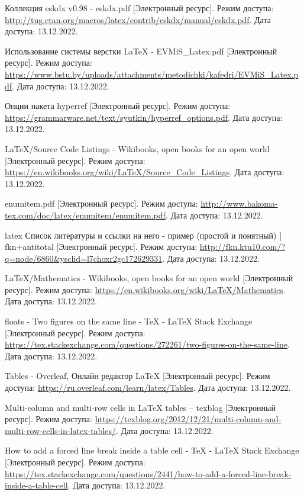   \begin{thebibliography}{}
    Коллекция eskdx v0.98 - eskdx.pdf
    [Электронный ресурс].
    Режим доступа: \url{http://tug.ctan.org/macros/latex/contrib/eskdx/manual/eskdx.pdf}.
    Дата доступа: 13.12.2022.
  
    Использование системы верстки LaTeX - EVMiS\_Latex.pdf
    [Электронный ресурс].
    Режим доступа: \url{https://www.bstu.by/uploads/attachments/metodichki/kafedri/EVMiS_Latex.pdf}.
    Дата доступа: 13.12.2022.
  
    Опции пакета hyperref
    [Электронный ресурс].
    Режим доступа: \url{https://grammarware.net/text/syutkin/hyperref_options.pdf}.
    Дата доступа: 13.12.2022.
  
    LaTeX/Source Code Listings - Wikibooks, open books for an open world
    [Электронный ресурс].
    Режим доступа: \url{https://en.wikibooks.org/wiki/LaTeX/Source_Code_Listings}.
    Дата доступа: 13.12.2022.
  
    enumitem.pdf
    [Электронный ресурс].
    Режим доступа: \url{http://www.bakoma-tex.com/doc/latex/enumitem/enumitem.pdf}.
    Дата доступа: 13.12.2022.
  
    latex Список литературы и ссылки на него - пример (простой и понятный) | fkn+antitotal
    [Электронный ресурс].
    Режим доступа: \url{http://fkn.ktu10.com/?q=node/6860&ysclid=l7choxr2gc172629331}.
    Дата доступа: 13.12.2022.

    LaTeX/Mathematics - Wikibooks, open books for an open world
    [Электронный ресурс].
    Режим доступа: \url{https://en.wikibooks.org/wiki/LaTeX/Mathematics}.
    Дата доступа: 13.12.2022.

    floats - Two figures on the same line - TeX - LaTeX Stack Exchange
    [Электронный ресурс].
    Режим доступа: \url{https://tex.stackexchange.com/questions/272261/two-figures-on-the-same-line}.
    Дата доступа: 13.12.2022.

    Tables - Overleaf, Онлайн редактор LaTeX
    [Электронный ресурс].
    Режим доступа: \url{https://ru.overleaf.com/learn/latex/Tables}.
    Дата доступа: 13.12.2022.

    Multi-column and multi-row cells in LaTeX tables – texblog
    [Электронный ресурс].
    Режим доступа: \url{https://texblog.org/2012/12/21/multi-column-and-multi-row-cells-in-latex-tables/}.
    Дата доступа: 13.12.2022.

    How to add a forced line break inside a table cell - TeX - LaTeX Stack Exchange
    [Электронный ресурс].
    Режим доступа: \url{https://tex.stackexchange.com/questions/2441/how-to-add-a-forced-line-break-inside-a-table-cell}.
    Дата доступа: 13.12.2022.   
  \end{thebibliography}
\endgroup

\newpage
